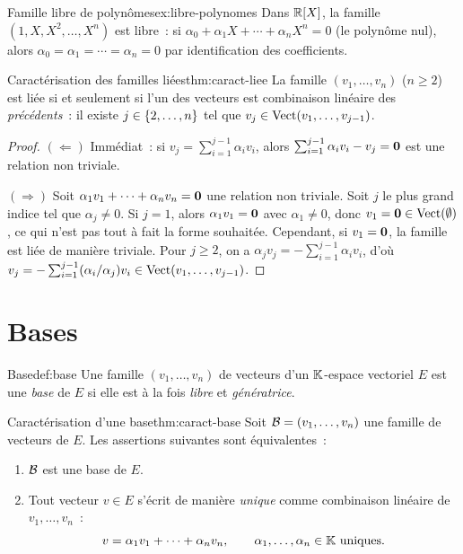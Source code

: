 \begin{example}{Famille libre de polynômes}{ex:libre-polynomes}
  Dans ${\mathbb{R}}[X]$, la famille $(1,X,X^2,\ldots,X^n)$ est libre~: si
  $\alpha_0+\alpha_1 X+\cdots+\alpha_n X^n=0$ (le polynôme nul),
  alors $\alpha_0=\alpha_1=\cdots=\alpha_n=0$ par identification des
  coefficients.
\end{example}

\begin{theorem}{Caractérisation des familles liées}{thm:caract-liee}
  La famille $(v_1,\ldots,v_n)$ ($n\geq 2$) est liée si et seulement
  si l'un des vecteurs est combinaison linéaire des \emph{précédents}~:
  il existe $j\in\left\{2,\ldots,n\right\}$ tel que
  $v_j\in\operatorname{Vect}(v_1,\ldots,v_{j-1})$.
\end{theorem}

\begin{proof}
  $(\Leftarrow)$ Immédiat~: si $v_j=\sum_{i=1}^{j-1}\alpha_i v_i$,
  alors $\sum_{i=1}^{j-1}\alpha_i v_i - v_j = \mathbf{0}$ est une
  relation non triviale.

  $(\Rightarrow)$ Soit $\alpha_1 v_1+\cdots+\alpha_n v_n=\mathbf{0}$ une
  relation non triviale. Soit $j$ le plus grand indice tel que
  $\alpha_j\neq 0$. Si $j=1$, alors $\alpha_1 v_1=\mathbf{0}$ avec
  $\alpha_1\neq 0$, donc $v_1=\mathbf{0}\in\operatorname{Vect}(\emptyset)$, ce qui
  n'est pas tout à fait la forme souhaitée. Cependant, si $v_1=\mathbf{0}$,
  la famille est liée de manière triviale. Pour $j\geq 2$, on a
  $\alpha_j v_j = -\sum_{i=1}^{j-1}\alpha_i v_i$, d'où
  $v_j = -\sum_{i=1}^{j-1}(\alpha_i/\alpha_j)v_i\in
  \operatorname{Vect}(v_1,\ldots,v_{j-1})$.
\end{proof}

\section{Bases}\label{sec:bases}

\begin{definition}{Base}{def:base}
  Une famille $(v_1,\ldots,v_n)$ de vecteurs d'un ${\mathbb{K}}$-espace vectoriel
  $E$ est une \emph{base} de $E$ si elle est à la fois
  \emph{libre} et \emph{génératrice}.
\end{definition}

\begin{theorem}{Caractérisation d'une base}{thm:caract-base}
  Soit ${\mathcal{B}}=(v_1,\ldots,v_n)$ une famille de vecteurs de $E$. Les
  assertions suivantes sont équivalentes~:
  \begin{enumerate}[label=(\roman*)]
    \item ${\mathcal{B}}$ est une base de $E$.
    \item Tout vecteur $v\in E$ s'écrit de manière \emph{unique} comme
      combinaison linéaire de $v_1,\ldots,v_n$~:
      \[
        v = \alpha_1 v_1 + \cdots + \alpha_n v_n,\qquad
        \alpha_1,\ldots,\alpha_n\in{\mathbb{K}}\text{ uniques.}
      \]
  \end{enumerate}
\end{theorem}

